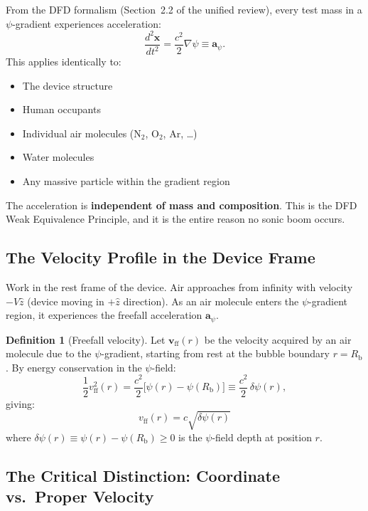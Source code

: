 \documentclass[12pt, letterpaper]{article}
\theoremstyle{definition}
\newtheorem{definition}{Definition}
\theoremstyle{remark}
\newcommand{\avec}{\mathbf{a}}
\newcommand{\vvec}{\mathbf{v}}
\newcommand{\xvec}{\mathbf{x}}
\newcommand{\Rbub}{R_{\mathrm{b}}}
\newcommand{\deltapsi}{\delta\psi}
\begin{document}
From the DFD formalism (Section~2.2 of the unified review), every test mass
in a $\psi$-gradient experiences acceleration:
\begin{equation}
\frac{d^2 \xvec}{dt^2} = \frac{c^2}{2}\nabla\psi \equiv \avec_\psi.
\label{eq:WEP}
\end{equation}
This applies identically to:
\begin{itemize}
\item The device structure
\item Human occupants
\item Individual air molecules (N$_2$, O$_2$, Ar, \ldots)
\item Water molecules
\item Any massive particle within the gradient region
\end{itemize}
The acceleration is \textbf{independent of mass and composition}. This is the
DFD Weak Equivalence Principle, and it is the entire reason no sonic boom occurs.

\subsection{The Velocity Profile in the Device Frame}

Work in the rest frame of the device. Air approaches from infinity with
velocity $-V\hat{z}$ (device moving in $+\hat{z}$ direction). As an air
molecule enters the $\psi$-gradient region, it experiences the freefall
acceleration $\avec_\psi$.

\begin{definition}[Freefall velocity]
Let $\vvec_{\mathrm{ff}}(r)$ be the velocity acquired by an air molecule due
to the $\psi$-gradient, starting from rest at the bubble boundary $r = \Rbub$.
By energy conservation in the $\psi$-field:
\begin{equation}
\frac{1}{2}v_{\mathrm{ff}}^2(r) = \frac{c^2}{2}\bigl[\psi(r) - \psi(\Rbub)\bigr]
\equiv \frac{c^2}{2}\,\deltapsi(r),
\label{eq:vff}
\end{equation}
giving:
\begin{equation}
\boxed{v_{\mathrm{ff}}(r) = c\sqrt{\deltapsi(r)}}
\label{eq:vff-result}
\end{equation}
where $\deltapsi(r) \equiv \psi(r) - \psi(\Rbub) \geq 0$ is the $\psi$-field
depth at position $r$.
\end{definition}

\subsection{The Critical Distinction: Coordinate vs.\ Proper Velocity}
\end{document}
